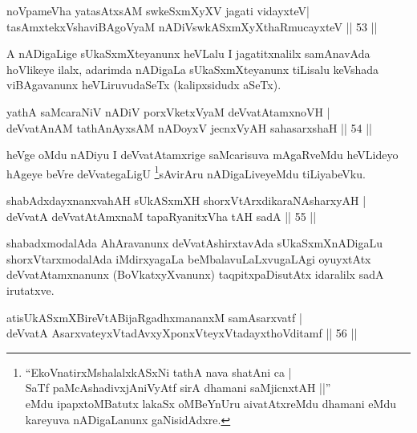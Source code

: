 \begin{shl}
noVpameVha yatasAtxsAM swkeSxmXyXV jagati vidayxteV|\\
tasAmxtekxVshaviBAgoV\s yaM nADiVswkASxmXyXthaRmucayxteV \hfill || 53 || 
\end{shl}

\begin{artha}
A nADigaLige sUkaSxmXteyanunx heVLalu I jagatitxnalilx samAnavAda hoVlikeye ilalx, adarimda nADigaLa sUkaSxmXteyanunx tiLisalu keVshada viBAgavanunx heVLiruvudaSeTx (kalipxsidudx aSeTx).
\end{artha}

\begin{shl}
yathA saMcaraNiV nADiV porxVketxVyaM deVvatAtamxnoVH |\\
deVvatAnAM tathA\s nAyxsAM nADoyxV jecnxVyAH sahasarxshaH \hfill || 54 || 
\end{shl}

\begin{artha}
heVge oMdu nADiyu I deVvatAtamxrige saMcarisuva mAgaRveMdu heVLideyo hAgeye beVre deVvategaLigU \footnote{``EkoVnatirxMshalalxkASxNi tathA nava shatAni ca | \\
SaTf paMcAshadivxjAniVyAtf sirA dhamani saMjicnxtAH ||''\\ eMdu ipapxtoMBatutx lakaSx oMBeYnUru aivatAtxreMdu dhamani eMdu kareyuva nADigaLanunx gaNisidAdxre.}sAvirAru nADigaLiveyeMdu tiLiyabeVku.
\end{artha}


\begin{shl}
shabAdxdayxnanxvahAH sUkASxmXH shorxVtArxdikaraNAsharxyAH |\\
deVvatA deVvatAtAmxnaM tapaRyanitxVha tAH sadA \hfill || 55 || 
\end{shl}

\begin{artha}
shabadxmodalAda AhAravanunx deVvatAshirxtavAda sUkaSxmXnADigaLu shorxVtarxmodalAda iMdirxyagaLa beMbalavuLaLxvugaLAgi oyuyxtAtx deVvatAtamxnanunx (BoVkatxyXvanunx) taqpitxpaDisutAtx idaralilx sadA irutatxve.
\end{artha}

\begin{shl}
atisUkASxmXBireVtABijaRgadhxmananxM samAsarxvatf |\\
deVvatA AsarxvateyxVtadAvxyXponxVteyxVtadayxthoVditamf \hfill || 56 || 
\end{shl}

